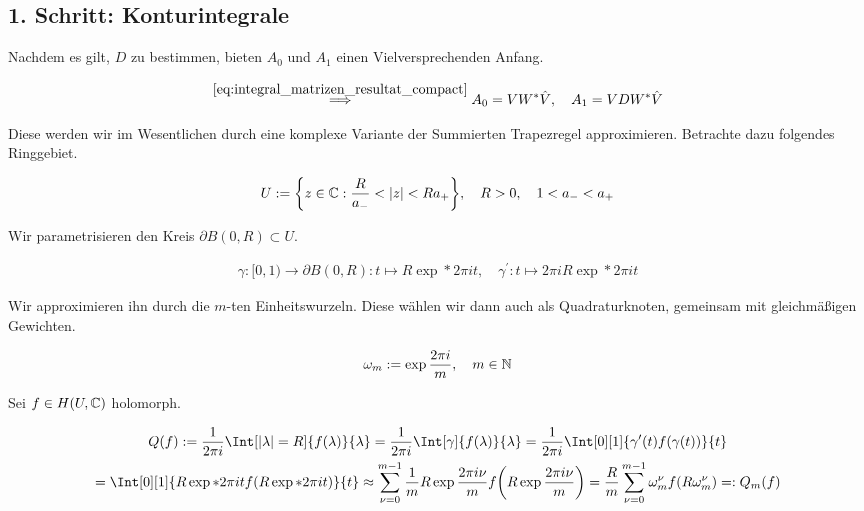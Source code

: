 \subsection*{1. Schritt: Konturintegrale}

Nachdem es gilt, $D$ zu bestimmen, bieten $A_0$ und $A_1$ einen Vielversprechenden Anfang.

\begin{align} \label{eq:integral_matrizen_resultat}
    \stackrel
    {
        \eqref{eq:integral_matrizen_resultat_compact}
    }{\implies}
    A_0 = V W^\ast \hat V,
    \quad
    A_1 = V D W^\ast \hat V
\end{align}

Diese werden wir im Wesentlichen durch eine komplexe Variante der Summierten Trapezregel approximieren.
Betrachte dazu folgendes Ringgebiet.

\begin{align*}
    U := {\left \{ z \in \mathbb{C}: \frac{R}{a_-} < |z| < R a_+ \right \}},
    \quad
    R > 0,
    \quad
    1 < a_- < a_+
\end{align*}

Wir parametrisieren den Kreis $\partial B(0, R) \subset U$.

\begin{align*}
    \gamma: [0, 1) \to \partial B(0, R): t \mapsto R \exp*{2 \pi i t},
    \quad
    \gamma^\prime: t \mapsto 2 \pi i R \exp*{2 \pi i t}
\end{align*}

Wir approximieren ihn durch die $m$-ten Einheitswurzeln.
Diese wählen wir dann auch als Quadraturknoten, gemeinsam mit gleichmäßigen Gewichten.

\begin{align*}
    \omega_m := \exp \frac{2 \pi i}{m},
    \quad
    m \in \mathbb{N}
\end{align*}

Sei $f \in H(U, \mathbb{C})$ holomorph.

\begin{multline*}
    Q(f)
    :=
    \frac{1}{2 \pi i}
    \Int[|\lambda| = R]
    {
        f(\lambda)
    }{\lambda}
    =
    \frac{1}{2 \pi i}
    \Int[\gamma]
    {
        f(\lambda)
    }{\lambda}
    =
    \frac{1}{2 \pi i}
    \Int[0][1]
    {
        \gamma^\prime(t)
        f(\gamma(t))
    }{t} \\
    =
    \Int[0][1]
    {
        R
        \exp*{2 \pi i t}
        f(R \exp*{2 \pi i t})
    }{t}
    \approx
    \sum_{\nu = 0}^{m-1}
        \frac{1}{m}
        R \exp \frac{2 \pi i \nu}{m}
        f
        \pbraces
        {
            R \exp \frac{2 \pi i \nu}{m}
        }
    =
    \frac{R}{m}
    \sum_{\nu = 0}^{m-1}
        \omega_m^\nu
        f(R \omega_m^\nu)
    =:
    Q_m(f)
\end{multline*}

